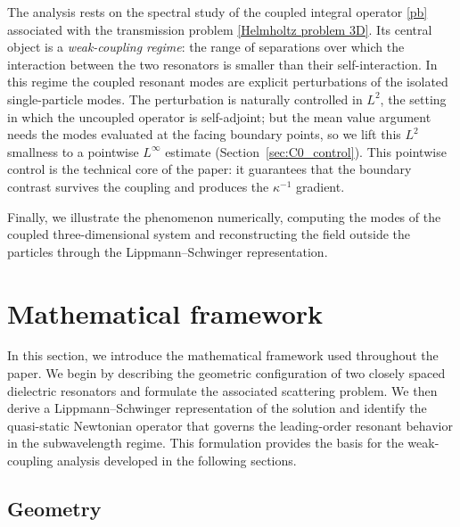 \documentclass[10pt]{article}
\numberwithin{equation}{section}
\begin{document}
The analysis rests on the spectral study of the coupled integral operator
\eqref{pb} associated with the transmission problem \eqref{Helmholtz problem 3D}.
Its central object is a \emph{weak-coupling regime}: the range of separations
over which the interaction between the two resonators is smaller than their
self-interaction. In this regime the coupled resonant modes are explicit
perturbations of the isolated single-particle modes. The perturbation is
naturally controlled in $L^2$, the setting in which the uncoupled operator is
self-adjoint; but the mean value argument needs the modes evaluated at the facing
boundary points, so we lift this $L^2$ smallness to a pointwise $L^\infty$
estimate (Section~\ref{sec:C0_control}). This pointwise control is the
technical core of the paper: it guarantees that the boundary contrast survives
the coupling and produces the $\kappa^{-1}$ gradient. 

Finally, we illustrate the phenomenon numerically, computing the modes of the
coupled three-dimensional system and reconstructing the field outside the
particles through the Lippmann--Schwinger representation.












\section{Mathematical framework}\label{sec:magnetic hotspot}



In this section, we introduce the mathematical framework used throughout the paper. We begin by describing the geometric configuration of two closely spaced dielectric resonators and formulate the associated scattering problem. We then derive a Lippmann--Schwinger representation of the solution and identify the quasi-static Newtonian operator that governs the leading-order resonant behavior in the subwavelength regime. This formulation provides the basis for the weak-coupling analysis developed in the following sections.




\subsection{Geometry}
\end{document}
